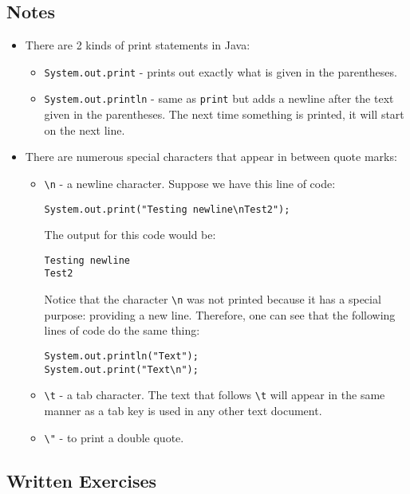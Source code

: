 \subsection{Notes}
\begin{itemize}
\item There are 2 kinds of print statements in Java:
\begin{itemize}
\item \verb|System.out.print| - prints out exactly what is given in the parentheses.
\item \verb|System.out.println| - same as \verb|print| but adds a newline after the text given in the parentheses. The next time something is printed, it will start on the next line.
\end{itemize}

\item There are numerous special characters that appear in between quote marks:
\begin{itemize}
\item \verb|\n| - a newline character. Suppose we have this line of code:
\begin{lstlisting}
System.out.print("Testing newline\nTest2");
\end{lstlisting}
The output for this code would be:
\begin{verbatim}
Testing newline
Test2
\end{verbatim}
Notice that the character \verb|\n| was not printed because it has a special purpose: providing a new line. Therefore, one can see that the following lines of code do the same thing:
\begin{verbatim}
System.out.println("Text");
System.out.print("Text\n");
\end{verbatim}
\item \verb|\t| - a tab character. The text that follows \verb|\t| will appear in the same manner as a tab key is used in any other text document.
\item \verb|\"| - to print a double quote.
\end{itemize}
\end{itemize}

\subsection{Written Exercises}

